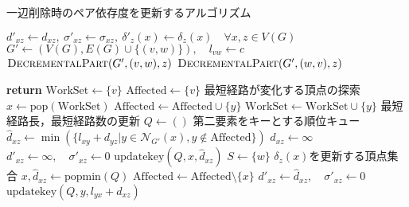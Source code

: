 \begin{algorithm}[tbp]
  \caption{一辺削除時のペア依存度を更新するアルゴリズム}
  \label{algo:decremental-algorithm}
  \begin{algorithmic}[1]\small
    \State $d'_{xz}\gets d_{xz},\:\sigma'_{xz}\gets \sigma_{xz},\:\delta'_z(x)\gets \delta_z(x)\quad\forall x,z\in V(G)$
    \State $G'\gets(V(G),E(G)\cup\{(v,w)\}),\quad l_{vw}\gets c$
    \State $\textsc{DecrementalPart}(G',(v,w),z)$
    \Else
    \State $\textsc{DecrementalPart}(G',(w,v),z)$
    \EndIf
    \EndFor
    \EndProcedure
  \end{algorithmic}
  \begin{multicols}{2}
    \begin{algorithmic}[1]\small
      \makeatletter
      \setcounter{ALG@line}{11}
      \makeatother
      \State \textbf{return}
      \EndIf
      \State $\mathrm{WorkSet}\gets\{v\}$
      \State $\mathrm{Affected}\gets\{v\}$
      \State
      \State \LeftComment 最短経路が変化する頂点の探索
      \State $x\gets\mathrm{pop}(\mathrm{WorkSet})$
      \State $\mathrm{Affected}\gets\mathrm{Affected}\cup\{y\}$
      \State $\mathrm{WorkSet}\gets\mathrm{WorkSet}\cup\{y\}$
      \EndIf
      \EndFor
      \EndWhile
      \State
      \State \LeftComment 最短経路長，最短経路数の更新
      \State $Q\gets()$ \Comment 第二要素をキーとする順位キュー
      \State $\hat{d}_{xz}\gets\min(\{l_{xy}+d_{yz}\vert y\in\mathcal{N}_{G'}(x),y\notin\mathrm{Affected}\})$
      \Else
      \State $\hat{d}_{xz}\gets\infty$
      \EndIf
      \State $d'_{xz}\gets\infty,\quad\sigma'_{xz}\gets 0$
      \Else
      \State $\mathrm{updatekey}(Q, x, \hat{d}_{xz})$
      \EndIf
      \EndFor
      \State
      \State $S\gets\{w\}$ \Comment $\delta_z(x)$を更新する頂点集合
      \State $x,\hat{d}_{xz}\gets\mathrm{popmin}(Q)$
      \State $\mathrm{Affected}\gets\mathrm{Affected}\setminus\{x\}$
      \State $d'_{xz}\gets\hat{d}_{xz},\quad\sigma'_{xz}\gets 0$
      \State $\mathrm{updatekey}(Q,y,l_{yx}+d_{xz})$

\end{algorithmic}
\end{multicols}
\end{algorithm}
